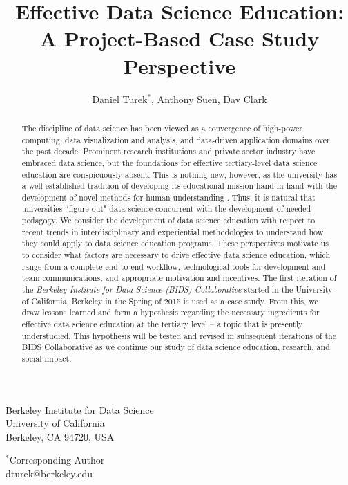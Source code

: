 \documentclass[12pt]{article}
\begin{document}
\title{Effective Data Science Education: \\
\large A Project-Based Case Study Perspective}

\author{Daniel Turek$^{*}$, Anthony Suen, Dav Clark}

\date{}

\maketitle

\vspace{0.4in}
\begin{center}

Berkeley Institute for Data Science \\
University of California \\
Berkeley, CA 94720, USA

\vspace{0.8in}

$^*$Corresponding Author \\
dturek@berkeley.edu
\end{center}

\thispagestyle{empty}
\newpage

\begin{abstract}
The discipline of data science has been viewed as a convergence of high-power computing, data visualization and analysis, and data-driven application domains over the past decade.  Prominent research institutions and private sector industry have embraced data science, but the foundations for effective tertiary-level data science education are conspicuously absent. This is nothing new, however, as the university has a well-established tradition of developing its educational mission hand-in-hand with the development of novel methods for human understanding \citep{feingold_tradition_1991}. Thus, it is natural that universities ``figure out" data science concurrent with the development of needed pedagogy. We consider the development of data science education with respect to recent trends in interdisciplinary and experiential methodologies to understand how they could apply to data science education programs. These perspectives motivate us to consider what factors are necessary to drive effective data science education, which range from a complete end-to-end workflow, technological tools for development and team communications, and appropriate motivation and incentives. The first iteration of the \emph{Berkeley Institute for Data Science (BIDS) Collaborative} started in the University of California, Berkeley in the Spring of 2015 is used as a case study. From this, we draw lessons learned and form a hypothesis regarding the necessary ingredients for effective data science education at the tertiary level -- a topic that is presently understudied.  This hypothesis will be tested and revised in subsequent iterations of the BIDS Collaborative as we continue our study of data science education, research, and social impact.
\end{abstract}
\end{document}
